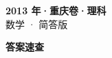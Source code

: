 \documentclass[zihao=-4, a4paper]{ctexart}
\begin{document}
\begin{center}
  {\Large\bfseries 2013 年·重庆卷·理科}\\[4pt]
  {\large 数学 · 简答版}
\end{center}
\medskip
{}

\clearpage
{}
\begin{center}{\Large\bfseries 答案速查}\end{center}
\medskip

\end{document}
